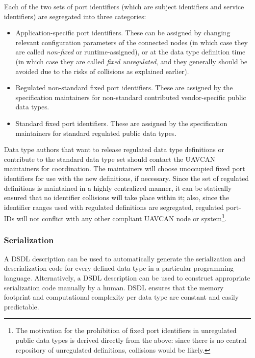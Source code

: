 Each of the two sets of port identifiers (which are subject identifiers and service identifiers) are
segregated into three categories:

\begin{itemize}
    \item Application-specific port identifiers.
          These can be assigned by changing relevant configuration parameters of the connected nodes
          (in which case they are called \emph{non-fixed} or runtime-assigned),
          or at the data type definition time (in which case they are called \emph{fixed unregulated},
          and they generally should be avoided due to the risks of collisions as explained earlier).

    \item Regulated non-standard fixed port identifiers.
          These are assigned by the specification maintainers for non-standard contributed
          vendor-specific public data types.

    \item Standard fixed port identifiers. These are assigned by the specification maintainers
          for standard regulated public data types.
\end{itemize}

Data type authors that want to release regulated data type definitions or contribute to the standard data
type set should contact the UAVCAN maintainers for coordination.
The maintainers will choose unoccupied fixed port identifiers for use with the new definitions, if necessary.
Since the set of regulated definitions is maintained in a highly centralized manner,
it can be statically ensured that no identifier collisions will take place within it;
also, since the identifier ranges used with regulated definitions are segregated,
regulated port-IDs will not conflict with any other compliant UAVCAN node or system\footnote{%
    The motivation for the prohibition of fixed port identifiers in unregulated public data types is
    derived directly from the above: since there is no central repository of unregulated definitions,
    collisions would be likely.
}.

\subsubsection{Serialization}

A DSDL description can be used to automatically generate the serialization and deserialization code
for every defined data type in a particular programming language.
Alternatively, a DSDL description can be used to construct appropriate serialization code manually by a human.
DSDL ensures that the memory footprint and computational complexity per data type
are constant and easily predictable.

